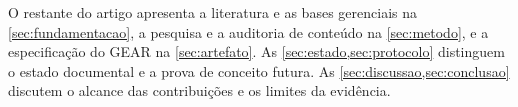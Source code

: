 O restante do artigo apresenta a literatura e as bases gerenciais na \cref{sec:fundamentacao}, a pesquisa e a auditoria de conteúdo na \cref{sec:metodo}, e a especificação do GEAR na \cref{sec:artefato}. As \cref{sec:estado,sec:protocolo} distinguem o estado documental e a prova de conceito futura. As \cref{sec:discussao,sec:conclusao} discutem o alcance das contribuições e os limites da evidência.
